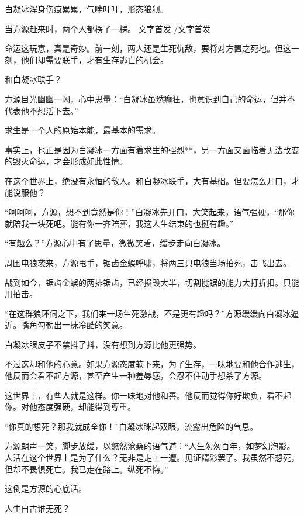 
\begin{this_body}

白凝冰浑身伤痕累累，气喘吁吁，形态狼狈。

当方源赶来时，两个人都楞了一楞。 文字首发 /文字首发

命运这玩意，真是奇妙。前一刻，两人还是生死仇敌，要将对方置之死地。但这一刻，他们却需要联手，才有生存逃亡的机会。

和白凝冰联手？

方源目光幽幽一闪，心中思量：“白凝冰虽然癫狂，也意识到自己的命运，但并不代表他不想活下去。”

求生是一个人的原始本能，最基本的需求。

事实上，也正是因为白凝冰一方面有着求生的强烈**，另一方面又面临着无法改变的毁灭命运，才会形成如此性情。

在这个世界上，绝没有永恒的敌人。和白凝冰联手，大有基础。但要怎么开口，才能说服他？

“呵呵呵，方源，想不到竟然是你！”白凝冰先开口，大笑起来，语气强硬，“那你就陪我一块死吧。能有你一齐陪葬，我这人生结束的也挺有趣。”

“有趣么？”方源心中有了思量，微微笑着，缓步走向白凝冰。

周围电狼袭来，方源甩手，锯齿金蜈呼啸，将两三只电狼当场拍死，击飞出去。

战到如今，锯齿金蜈的两排锯齿，已经损毁大半，切割搅锯的能力大打折扣。只能用拍击。

“在这群狼环伺之下，我们来一场生死激战，不是更有趣吗？”方源缓缓向白凝冰逼近。嘴角勾勒出一抹冷酷的笑意。

白凝冰眼皮子不禁抖了抖，没有想到方源比他更强势。

不过这却和他的心意。如果方源态度软下来，为了生存，一味地要和他合作逃生，他反而会看不起方源，甚至产生一种羞辱感，会忍不住动手想杀了方源。

这世界上，有些人就是这样。你一味地对他和善。他反而觉得你好欺负，看不起你。对他态度强硬，却能得到尊重。

“你真的想死？那我就成全你！”白凝冰眯起双眼，流露出危险的气息。

方源朗声一笑，脚步放缓，以悠然沧桑的语气道：“人生匆匆百年，如梦幻泡影。人活在这个世界上是为了什么？无非是走上一遭。见证精彩罢了。我虽然不想死，但却不畏惧死亡。我已走在路上。纵死不悔。”

这倒是方源的心底话。

人生自古谁无死？


\end{this_body}
